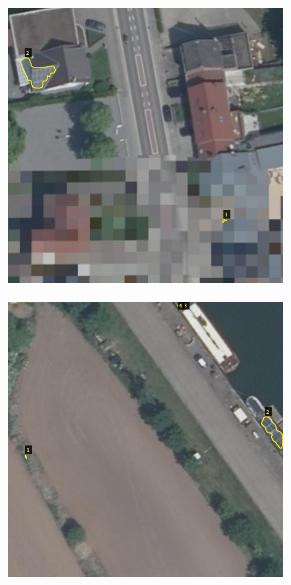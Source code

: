 \documentclass[a4paper, 12pt]{article}
\begin{document}
\begin{figure}[H]
    \begin{subfigure}{0.49\textwidth}
        \centering
        \includegraphics[width=0.8\textwidth]{resources/jpg/609090_533187.jpg}
    \end{subfigure}
    \begin{subfigure}{0.49\textwidth}
        \centering
        \includegraphics[width=0.8\textwidth]{resources/jpg/609090_533191.jpg}
    \end{subfigure}
    \label{fig:vgg_image_annotator}
\end{figure}
\end{document}

